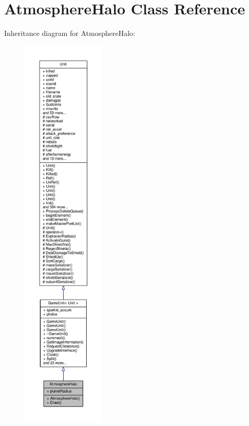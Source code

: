 \hypertarget{classAtmosphereHalo}{}\section{Atmosphere\+Halo Class Reference}
\label{classAtmosphereHalo}


Inheritance diagram for Atmosphere\+Halo\+:
\nopagebreak
\begin{figure}[H]
\begin{center}
\leavevmode
\includegraphics[height=550pt]{d8/d89/classAtmosphereHalo__inherit__graph}
\end{center}
\end{figure}


